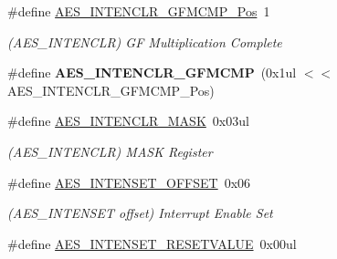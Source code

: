 \begin{DoxyCompactItemize}
\item 
\hypertarget{group___s_a_m_l21___a_e_s_ga69c8e4f1c9a1bb1ed6eade39cb48715b}{}\#define \hyperlink{group___s_a_m_l21___a_e_s_ga69c8e4f1c9a1bb1ed6eade39cb48715b}{A\+E\+S\+\_\+\+I\+N\+T\+E\+N\+C\+L\+R\+\_\+\+G\+F\+M\+C\+M\+P\+\_\+\+Pos}~1\label{group___s_a_m_l21___a_e_s_ga69c8e4f1c9a1bb1ed6eade39cb48715b}

\begin{DoxyCompactList}\small\item\em (A\+E\+S\+\_\+\+I\+N\+T\+E\+N\+C\+L\+R) G\+F Multiplication Complete \end{DoxyCompactList}\item 
\hypertarget{group___s_a_m_l21___a_e_s_ga46c9c3dfcd2b6bd042c86d1f06667588}{}\#define {\bfseries A\+E\+S\+\_\+\+I\+N\+T\+E\+N\+C\+L\+R\+\_\+\+G\+F\+M\+C\+M\+P}~(0x1ul $<$$<$ A\+E\+S\+\_\+\+I\+N\+T\+E\+N\+C\+L\+R\+\_\+\+G\+F\+M\+C\+M\+P\+\_\+\+Pos)\label{group___s_a_m_l21___a_e_s_ga46c9c3dfcd2b6bd042c86d1f06667588}

\item 
\hypertarget{group___s_a_m_l21___a_e_s_ga28f6072f3596258d9dc75220163b45bd}{}\#define \hyperlink{group___s_a_m_l21___a_e_s_ga28f6072f3596258d9dc75220163b45bd}{A\+E\+S\+\_\+\+I\+N\+T\+E\+N\+C\+L\+R\+\_\+\+M\+A\+S\+K}~0x03ul\label{group___s_a_m_l21___a_e_s_ga28f6072f3596258d9dc75220163b45bd}

\begin{DoxyCompactList}\small\item\em (A\+E\+S\+\_\+\+I\+N\+T\+E\+N\+C\+L\+R) M\+A\+S\+K Register \end{DoxyCompactList}\item 
\hypertarget{group___s_a_m_l21___a_e_s_ga2c2335c63929a0ec59348053f8a4a6b8}{}\#define \hyperlink{group___s_a_m_l21___a_e_s_ga2c2335c63929a0ec59348053f8a4a6b8}{A\+E\+S\+\_\+\+I\+N\+T\+E\+N\+S\+E\+T\+\_\+\+O\+F\+F\+S\+E\+T}~0x06\label{group___s_a_m_l21___a_e_s_ga2c2335c63929a0ec59348053f8a4a6b8}

\begin{DoxyCompactList}\small\item\em (A\+E\+S\+\_\+\+I\+N\+T\+E\+N\+S\+E\+T offset) Interrupt Enable Set \end{DoxyCompactList}\item 
\hypertarget{group___s_a_m_l21___a_e_s_gac6efb10bfdf13c1a656ce565e3a22c6c}{}\#define \hyperlink{group___s_a_m_l21___a_e_s_gac6efb10bfdf13c1a656ce565e3a22c6c}{A\+E\+S\+\_\+\+I\+N\+T\+E\+N\+S\+E\+T\+\_\+\+R\+E\+S\+E\+T\+V\+A\+L\+U\+E}~0x00ul\label{group___s_a_m_l21___a_e_s_gac6efb10bfdf13c1a656ce565e3a22c6c}


\end{DoxyCompactItemize}
